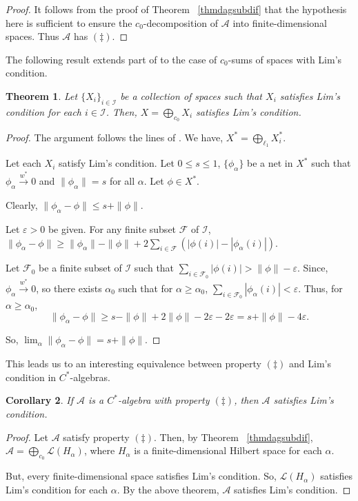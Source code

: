 \documentclass[11pt]{amsart}
\newcommand{\F}{\mathcal{F}}
\newcommand{\I}{\mathcal {I}}
\newcommand{\cA}{\mathcal A}
\newcommand{\e}{\varepsilon}
\newtheorem{thm}{Theorem}
\newtheorem{cor}[thm]{Corollary}
\begin{document}
\begin{proof} 
It follows from the proof of Theorem ~\ref{thmdagsubdif} that the hypothesis here is sufficient to ensure the $c_0$-decomposition of ${\mathcal A}$ into finite-dimensional spaces. Thus ${\mathcal A}$ has $(\ddag)$.
\end{proof}

The following result extends part of \cite[Theorem 4]{LM} to the case of $c_0$-sums of spaces with Lim's condition. 

\begin{thm} \label{tlimsum}
	Let $\{X_i\}_{i \in \I}$ be a collection of spaces such that $X_i$ satisfies Lim's condition for each $i \in \I$. Then, $X=\bigoplus_{c_0} X_i$ satisfies Lim's condition.
\end{thm}

\begin{proof}
	The argument follows the lines of \cite[Theorem 4]{LM}. We have, $X^*=\bigoplus_{\ell_1} X_i^*$. 
      
	Let each $X_i$ satisfy Lim's condition. Let $0 \leq s \leq 1$,  $\{\phi_\alpha\}$ be a net in $X^*$ such that $\phi_\alpha \xrightarrow{w^\ast} 0$ and $\|\phi_\alpha\|=s$ for all $\alpha$. Let $\phi \in X^*$.
    
    Clearly, $\|\phi_\alpha - \phi\| \leq s + \|\phi\|$.
	
	Let $\e >0$ be given. For any finite subset $\F$ of $\I$, $\|\phi_\alpha-\phi\| \geq \|\phi_\alpha\|-\|\phi\| + 2 \sum_{i \in \F}(|\phi(i)|-|\phi_\alpha(i)|)$. 
    
    Let $\F_0$ be a finite subset of $\I$ such that $\sum_{i \in \F_0} |\phi(i)| >\|\phi\| - \e$. Since, $\phi_{\alpha} \xrightarrow{w^\ast} 0$, so there exists $\alpha_0$ such that for $\alpha \geq \alpha_0$, $\sum_{i \in \F_0} |\phi_\alpha (i)| <\e$. Thus, for $\alpha \geq \alpha_0$,
	\[
	\|\phi_\alpha - \phi\| \geq s - \|\phi\| + 2 \|\phi\| - 2\e - 2\e = s + \|\phi\| - 4\e.
	\]
	
	So, $\lim_\alpha \|\phi_\alpha - \phi\| = s + \|\phi\|$.
\end{proof}

This leads us to an interesting equivalence between property $(\ddag)$ and Lim's condition in $C^*$-algebras.
\begin{cor}
 If $\cA$ is a $C^*$-algebra with property $(\ddagger)$, then $\cA$ satisfies Lim's condition.   
\end{cor}

\begin{proof}
    Let $\cA$ satisfy property $(\ddagger)$. Then, by Theorem ~\ref{thmdagsubdif}, $\cA=\bigoplus_{c_0}\mathcal{L}(H_\alpha)$, where $H_\alpha$ is a finite-dimensional Hilbert space for each $\alpha$. 
    
    But, every finite-dimensional space satisfies Lim's condition. So, $\mathcal{L}(H_\alpha)$ satisfies Lim's condition for each $\alpha$. By the above theorem, $\cA$ satisfies Lim's condition.
\end{proof}
\end{document}
